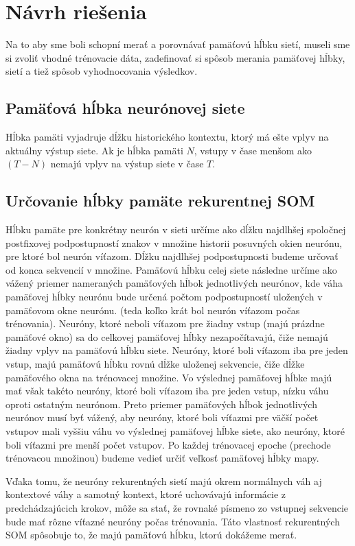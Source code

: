 \chapter{Návrh riešenia}
Na to aby sme boli schopní merať a porovnávať pamäťovú hĺbku sietí, museli sme si
zvoliť vhodné trénovacie dáta, zadefinovať si spôsob merania pamäťovej hĺbky,
sietí a tiež spôsob vyhodnocovania výsledkov.

\section{Pamäťová hĺbka neurónovej siete}
Hĺbka pamäti vyjadruje dĺžku historického kontextu, ktorý má ešte vplyv na aktuálny výstup siete.
Ak je hĺbka pamäti $N$, vstupy v čase menšom ako $(T - N)$ nemajú vplyv na výstup siete v čase $T$.

\section{Určovanie hĺbky pamäte rekurentnej SOM}
Hĺbku pamäte pre konkrétny neurón v sieti určíme ako dĺžku najdlhšej spoločnej postfixovej
podpostupností znakov v množine historii posuvných okien neurónu, pre ktoré bol neurón víťazom.
Dĺžku najdlhšej podpostupnosti budeme určovať od konca sekvencií v množine.
Pamäťovú hĺbku celej siete následne určíme ako vážený priemer nameraných pamäťových hĺbok jednotlivých neurónov, 
kde váha pamäťovej hĺbky neurónu bude určená počtom podpostupností uložených v pamäťovom okne neurónu.
(teda koľko krát bol neurón víťazom počas trénovania).
Neuróny, ktoré neboli víťazom pre žiadny vstup (majú prázdne pamäťové okno)
sa do celkovej pamäťovej hĺbky nezapočítavajú, čiže nemajú žiadny vplyv na pamäťovú hĺbku siete.
Neuróny, ktoré boli víťazom iba pre jeden vstup, majú pamäťovú hĺbku rovnú dĺžke uloženej sekvencie, čiže dĺžke pamäťového okna na trénovacej množine.
Vo výslednej pamäťovej hĺbke majú mať však takéto neuróny, ktoré boli víťazom iba pre jeden vstup, nízku váhu oproti ostatným neurónom.
Preto priemer pamäťových hĺbok jednotlivých neurónov musí byť vážený, aby neuróny, 
ktoré boli víťazmi pre väčší počet vstupov mali vyššiu váhu vo výslednej pamäťovej hĺbke siete, ako neuróny, ktoré boli víťazmi pre menší počet vstupov.
Po každej trénovacej epoche (prechode trénovacou množinou) budeme vedieť určiť veľkosť pamäťovej hĺbky mapy.

Vďaka tomu, že neuróny rekurentných sietí majú okrem normálnych váh aj kontextové váhy a samotný kontext, 
ktoré uchovávajú informácie z predchádzajúcich krokov, môže sa stať, že rovnaké písmeno zo vstupnej sekvencie 
bude mať rôzne víťazné neuróny počas trénovania. Táto vlastnosť rekurentných SOM spôsobuje to, že majú pamäťovú hĺbku, ktorú dokážeme merať.


